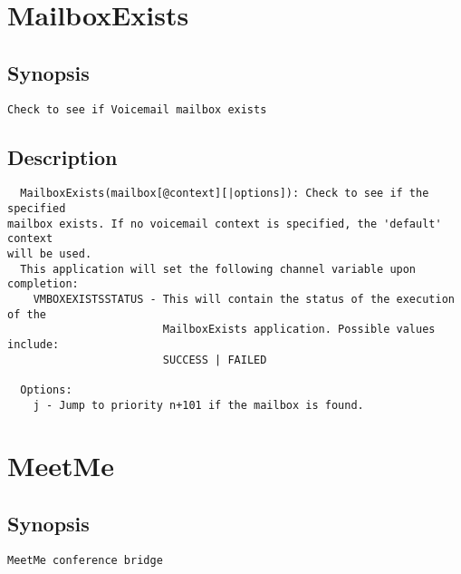 \section{MailboxExists}
\subsection{Synopsis}
\begin{verbatim}
Check to see if Voicemail mailbox exists
\end{verbatim}
\subsection{Description}
\begin{verbatim}
  MailboxExists(mailbox[@context][|options]): Check to see if the specified
mailbox exists. If no voicemail context is specified, the 'default' context
will be used.
  This application will set the following channel variable upon completion:
    VMBOXEXISTSSTATUS - This will contain the status of the execution of the
                        MailboxExists application. Possible values include:
                        SUCCESS | FAILED

  Options:
    j - Jump to priority n+101 if the mailbox is found.

\end{verbatim}


\section{MeetMe}
\subsection{Synopsis}
\begin{verbatim}
MeetMe conference bridge
\end{verbatim}
